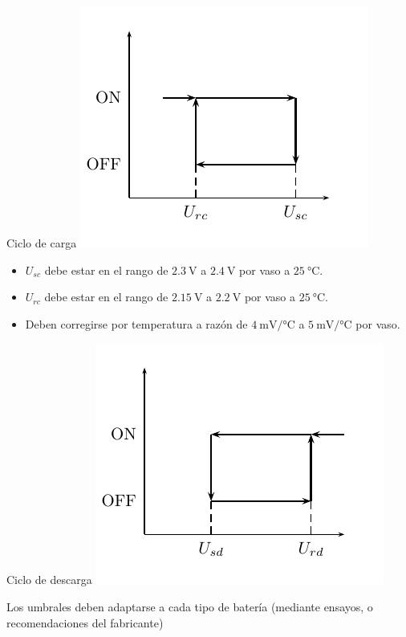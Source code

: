 \documentclass[xcolor={usenames,svgnames,dvipsnames}]{beamer}
\begin{document}
\begin{frame}[label=sec-3-0-3]{Ciclo de carga}
\includegraphics[height=0.5\textheight]{../figs/HisteresisCargaRegulador.pdf}

\begin{itemize}
\item $U_{sc}$ debe estar en el rango de $\SI{2.3}{\volt}$ a $\SI{2.4}{\volt}$ por vaso a $\SI{25}{\celsius}$.

\item $U_{rc}$ debe estar en el rango de $\SI{2.15}{\volt}$ a $\SI{2.2}{\volt}$ por vaso a $\SI{25}{\celsius}$.

\item \alert{Deben corregirse por temperatura} a razón de $\SI{4}{\milli\volt\per\celsius}$ a $\SI{5}{\milli\volt\per\celsius}$ por vaso.
\end{itemize}
\end{frame}

\begin{frame}[label=sec-3-0-4]{Ciclo de descarga}
\includegraphics[height=0.5\textheight]{../figs/HisteresisDescargaRegulador.pdf}

Los umbrales deben adaptarse a cada tipo de batería (mediante ensayos, o recomendaciones del fabricante)
\end{frame}
\end{document}
